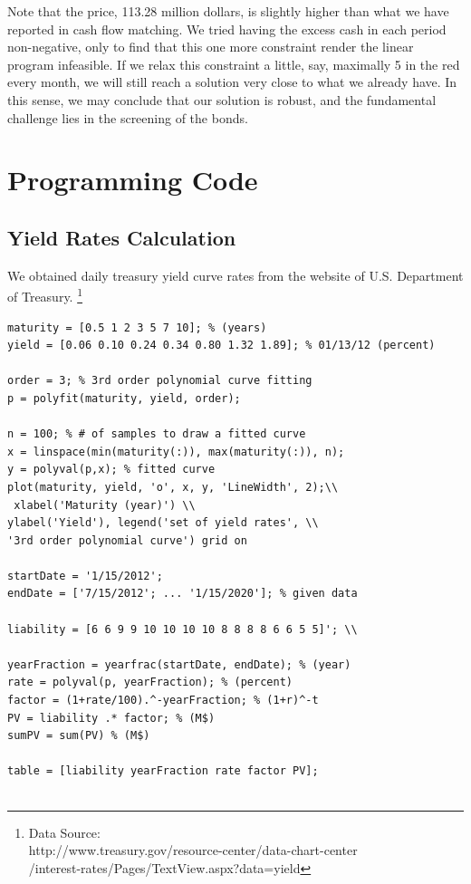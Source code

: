 \documentclass[oneside,12pt]{report}
\begin{document}
\noindent Note that the price, 113.28 million dollars, is slightly higher than what we have reported in cash flow matching. We tried having the excess cash in each period non-negative, only to find that this one more constraint render the linear program infeasible. If we relax this constraint a little, say, maximally 5 in the red every month, we will still reach a solution very close to what we already have. In this sense, we may conclude that our solution is robust, and the fundamental challenge lies in the screening of the bonds.

%
%
%

%
%
%
%
%
%


\appendix
{}
\chapter{Programming Code}\label{Programming Code}
\section{Yield Rates Calculation}
We obtained daily treasury yield curve rates from the website of U.S. Department of Treasury. 
\footnote{Data Source: \\
 http://www.treasury.gov/resource-center/data-chart-center\\
/interest-rates/Pages/TextView.aspx?data=yield} 
\begin{lstlisting}
maturity = [0.5 1 2 3 5 7 10]; % (years)
yield = [0.06 0.10 0.24 0.34 0.80 1.32 1.89]; % 01/13/12 (percent)
 
order = 3; % 3rd order polynomial curve fitting
p = polyfit(maturity, yield, order);
 
n = 100; % # of samples to draw a fitted curve
x = linspace(min(maturity(:)), max(maturity(:)), n); 
y = polyval(p,x); % fitted curve
plot(maturity, yield, 'o', x, y, 'LineWidth', 2);\\
 xlabel('Maturity (year)') \\
ylabel('Yield'), legend('set of yield rates', \\
'3rd order polynomial curve') grid on
 
startDate = '1/15/2012';
endDate = ['7/15/2012'; ... '1/15/2020']; % given data
 
liability = [6 6 9 9 10 10 10 10 8 8 8 8 6 6 5 5]'; \\
 
yearFraction = yearfrac(startDate, endDate); % (year)
rate = polyval(p, yearFraction); % (percent)
factor = (1+rate/100).^-yearFraction; % (1+r)^-t
PV = liability .* factor; % (M$)
sumPV = sum(PV) % (M$)
 
table = [liability yearFraction rate factor PV];


\end{lstlisting}
\end{document}
